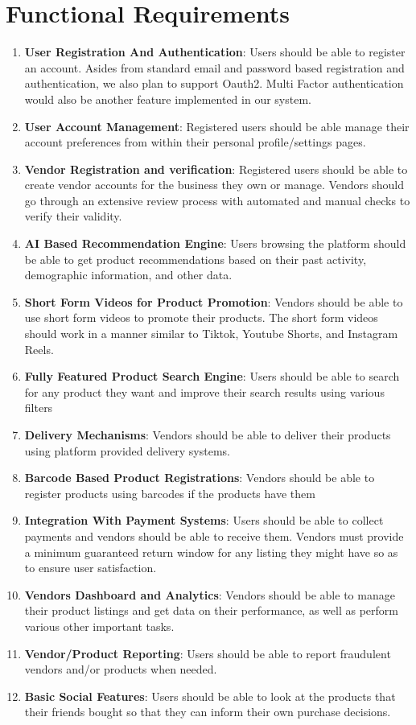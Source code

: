 \documentclass[12pt]{report}
\begin{document}
\section{Functional Requirements}

\begin{enumerate}
	\item \textbf{User Registration And Authentication}: Users should be able to register an account.
	      Asides from standard email and password based registration and authentication, we
	      also plan to support Oauth2. Multi Factor authentication would also be another feature
	      implemented in our system.
	\item \textbf{User Account Management}: Registered users should be able manage their account
	      preferences from within their personal profile/settings pages.
	\item \textbf{Vendor Registration and verification}: Registered users should be able to create
	      vendor accounts for the business they own or manage. Vendors should go through an
	      extensive review process with automated and manual checks to verify their validity.
	\item \textbf{AI Based Recommendation Engine}: Users browsing the platform should be able to
	      get product recommendations based on their past activity, demographic information,
	      and other data.
	\item \textbf{Short Form Videos for Product Promotion}: Vendors should be able to use short
	      form videos to promote their products. The short form videos should work in a
	      manner similar to Tiktok, Youtube Shorts, and Instagram Reels.
	\item \textbf{Fully Featured Product Search Engine}: Users should be able to search for any
	      product they want and improve their search results using various filters
	\item \textbf{Delivery Mechanisms}: Vendors should be able to deliver their products using
	      platform provided delivery systems.
	\item \textbf{Barcode Based Product Registrations}: Vendors should be able to register products
	      using barcodes if the products have them
	\item \textbf{Integration With Payment Systems}: Users should be able to collect payments and
	      vendors should be able to receive them. Vendors must provide a minimum guaranteed
	      return window for any listing they might have so as to ensure user satisfaction.
	\item \textbf{Vendors Dashboard and Analytics}: Vendors should be able to manage their product
	      listings and get data on their performance, as well as perform various other important
	      tasks.
	\item \textbf{Vendor/Product Reporting}: Users should be able to report fraudulent vendors and/or products
	      when needed.
	\item \textbf{Basic Social Features}: Users should be able to look at the products that their friends
	      bought so that they can inform their own purchase decisions.
\end{enumerate}
\end{document}
